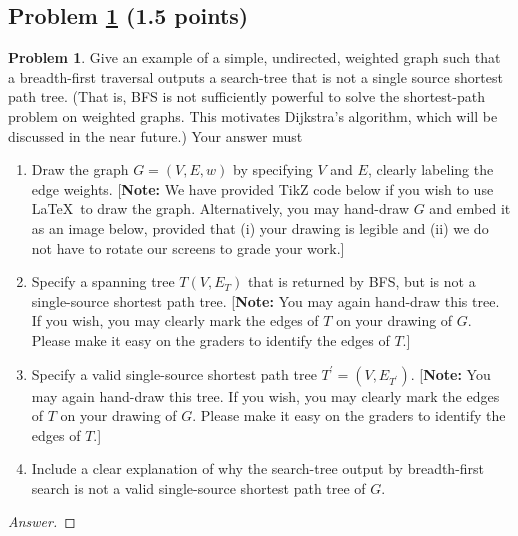 \documentclass[11pt]{article}
\theoremstyle{definition}
\theoremstyle{definition}
\newtheorem{required}{Problem}
\theoremstyle{definition}
\begin{document}
\newpage
\subsection{Problem \ref{DFS4} (1.5 points)}
\begin{required} \label{DFS4}
	Give an example of a simple, undirected, weighted graph such that a breadth-first traversal outputs a search-tree that is not a single source shortest path tree. (That is, BFS is not sufficiently powerful to solve the shortest-path problem on weighted graphs. This motivates Dijkstra's algorithm, which will be discussed in the near future.) 
	Your answer must
	\begin{enumerate}[label=(\alph*)]
		\item Draw the graph $G = (V,E, w)$ by specifying $V$ and $E$, clearly labeling the edge weights.  [\textbf{Note:} We have provided TikZ code below if you wish to use \LaTeX \ to draw the graph. Alternatively, you may hand-draw $G$ and embed it as an image below, provided that (i) your drawing is legible and (ii) we do not have to rotate our screens to grade your work.]
		\item Specify a spanning tree $T(V, E_{T})$ that is returned by BFS, but is not a single-source shortest path tree. [\textbf{Note:} You may again hand-draw this tree. If you wish, you may clearly mark the edges of $T$ on your drawing of $G$. Please make it easy on the graders to identify the edges of $T$.] 

		\item Specify a valid single-source shortest path tree $T^{\prime} = (V,E_{T^{\prime}})$.  [\textbf{Note:} You may again hand-draw this tree. If you wish, you may clearly mark the edges of $T$ on your drawing of $G$. Please make it easy on the graders to identify the edges of $T$.] 

		\item Include a clear explanation of why the search-tree output by breadth-first search is not a valid single-source shortest path tree of $G$.
	\end{enumerate}
\end{required}


\begin{proof}[Answer]
\end{proof}
\end{document}
